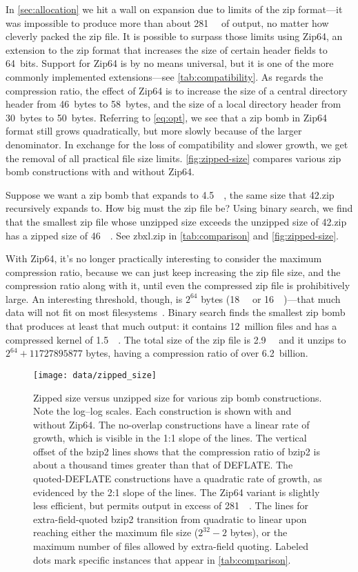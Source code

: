 \documentclass[letterpaper,twocolumn,10pt]{article}
\newcommand{\MB}{\mega\byte}
\newcommand{\GB}{\giga\byte}
\newcommand{\TB}{\tera\byte}
\newcommand{\PB}{\peta\byte}
\newcommand{\EB}{\exa\byte}
\newcommand{\EiB}{\exbi\byte}
\begin{document}
In \autoref{sec:allocation} we hit a wall on expansion
due to limits of the zip format---it was impossible
to produce more than about \SI{281}{\TB} of output,
no matter how cleverly packed the zip file.
It is possible to surpass those limits
using Zip64, an extension to the zip format that increases
the size of certain header fields to 64~bits.
Support for Zip64 is by no means universal,
but it is one of the more commonly implemented extensions---see \autoref{tab:compatibility}.
As regards the compression ratio,
the effect of Zip64 is to
increase the size of a central directory header from
\SI{46}{bytes} to \SI{58}{bytes},
and the size of a local directory header from
\SI{30}{bytes} to \SI{50}{bytes}.
Referring to \autoref{eq:opt},
we see that a zip bomb in Zip64 format
still grows quadratically,
but more slowly because of the larger denominator.
In exchange for the loss of compatibility
and slower growth,
we get the removal of all practical file size limits.
\autoref{fig:zipped-size} compares various zip bomb constructions
with and without Zip64.

Suppose we want a zip bomb that expands to \SI{4.5}{\PB},
the same size that 42.zip recursively expands to.
How big must the zip file be?
Using binary search, we find that the smallest
zip file whose unzipped size exceeds the unzipped size of 42.zip
has a zipped size of \SI{46}{\MB}.
See \mbox{zbxl.zip} in \autoref{tab:comparison} and \autoref{fig:zipped-size}.

With Zip64, it's no longer practically interesting to
consider the maximum compression ratio,
because we can just keep increasing the zip file size,
and the compression ratio along with it,
until even the compressed zip file is prohibitively large.
An interesting threshold, though,
is $2^{64}$ bytes
(\SI{18}{\EB} or \SI{16}{\EiB})---that
much data will not fit on most filesystems~\cite[\S Limits]{wiki-fs}.
Binary search finds the smallest zip bomb that produces at least that much output:
it contains 12~million files and has a compressed kernel of \SI{1.5}{\GB}.
The total size of the zip file is \SI{2.9}{\GB} and it unzips
to $2^{64}+\num{11727895877}$ bytes,
having a compression ratio of over 6.2~billion.

\begin{figure}
\texttt{[image: data/zipped\_size]}
\caption{
Zipped size versus unzipped size for various zip bomb constructions.
Note the log--log scales.
Each construction is shown with and without Zip64.
The no-overlap constructions
have a linear rate of growth,
which is visible in the 1:1 slope of the lines.
The vertical offset of the bzip2 lines shows that the compression ratio
of bzip2 is about a thousand times greater than that of DEFLATE.
The quoted-DEFLATE constructions
have a quadratic rate of growth,
as evidenced by the 2:1 slope of the lines.
The Zip64 variant is slightly less efficient,
but permits output in excess of \SI{281}{\TB}.
The lines for extra-field-quoted bzip2
transition from quadratic to linear
upon reaching either the maximum file size ($2^{32}-2$ bytes),
or the maximum number of files allowed by extra-field quoting.
Labeled dots mark specific instances that
appear in \autoref{tab:comparison}.
}
\label{fig:zipped-size}
\end{figure}
\end{document}
